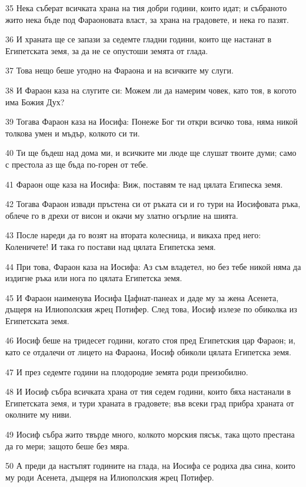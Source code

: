 \par 35 Нека съберат всичката храна на тия добри години, които идат; и събраното жито нека бъде под Фараоновата власт, за храна на градовете, и нека го пазят.
\par 36 И храната ще се запази за седемте гладни години, които ще настанат в Египетската земя, за да не се опустоши земята от глада.
\par 37 Това нещо беше угодно на Фараона и на всичките му слуги.
\par 38 И Фараон каза на слугите си: Можем ли да намерим човек, като тоя, в когото има Божия Дух?
\par 39 Тогава Фараон каза на Иосифа: Понеже Бог ти откри всичко това, няма никой толкова умен и мъдър, колкото си ти.
\par 40 Ти ще бъдеш над дома ми, и всичките ми люде ще слушат твоите думи; само с престола аз ще бъда по-горен от тебе.
\par 41 Фараон още каза на Иосифа: Виж, поставям те над цялата Египеска земя.
\par 42 Тогава Фараон извади пръстена си от ръката си и го тури на Иосифовата ръка, облече го в дрехи от висон и окачи му златно огърлие на шията.
\par 43 После нареди да го возят на втората колесница, и викаха пред него: Коленичете! И така го постави над цялата Египетска земя.
\par 44 При това, Фараон каза на Иосифа: Аз съм владетел, но без тебе никой няма да издигне ръка или нога по цялата Египетска земя.
\par 45 И Фараон наименува Иосифа Цафнат-панеах и даде му за жена Асенета, дъщеря на Илиополския жрец Потифер. След това, Иосиф излезе по обиколка из Египетската земя.
\par 46 Иосиф беше на тридесет години, когато стоя пред Египетския цар Фараон; и, като се отдалечи от лицето на Фараона, Иосиф обиколи цялата Египетска земя.
\par 47 И през седемте години на плодородие земята роди преизобилно.
\par 48 И Иосиф събра всичката храна от тия седем години, които бяха настанали в Египетската земя, и тури храната в градовете; във всеки град прибра храната от околните му ниви.
\par 49 Иосиф събра жито твърде много, колкото морския пясък, така щото престана да го мери; защото беше без мяра.
\par 50 А преди да настъпят годините на глада, на Иосифа се родиха два сина, които му роди Асенета, дъщеря на Илиополския жрец Потифер.
